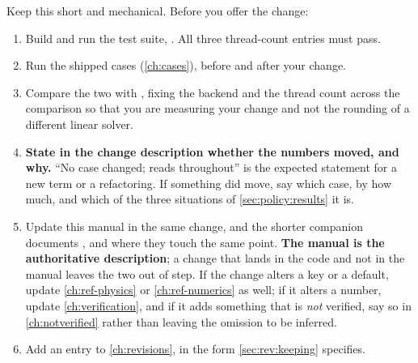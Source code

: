 Keep this short and mechanical. Before you offer the change:

\begin{enumerate}
  \item Build and run the test suite, . All three
    thread-count entries must pass.
  \item Run the shipped cases (\cref{ch:cases}), before and after your change.
  \item Compare the two with , fixing the backend and
    the thread count across the comparison so that you are measuring your
    change and not the rounding of a different linear solver.
  \item \textbf{State in the change description whether the numbers moved, and
    why.} ``No case changed;  reads 
    throughout'' is the expected statement for a new term or a refactoring. If
    something did move, say which case, by how much, and which of the three
    situations of \cref{sec:policy:results} it is.
  \item Update this manual in the same change, and the shorter companion
    documents ,  and
     where they touch the same point. \textbf{The
    manual is the authoritative description}; a change that lands in the code
    and not in the manual leaves the two out of step. If the change alters a key or a default, update
    \cref{ch:ref-physics} or \cref{ch:ref-numerics} as well; if it alters a
    number, update \cref{ch:verification}, and if it adds something that is
    \emph{not} verified, say so in \cref{ch:notverified} rather than leaving
    the omission to be inferred.
  \item Add an entry to \cref{ch:revisions}, in the form
    \cref{sec:rev:keeping} specifies.
\end{enumerate}
